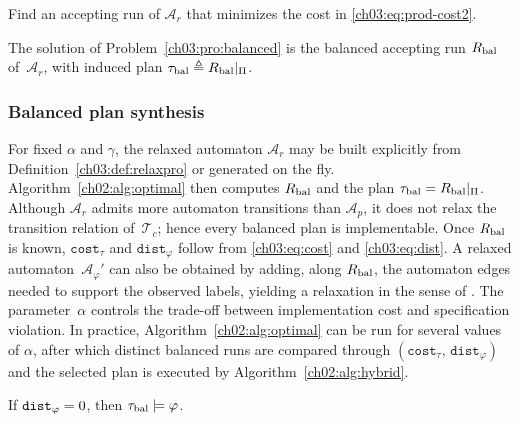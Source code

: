 \begin{problem}\label{ch03:pro:balanced}
Find an accepting run of $\mathcal{A}_r$ that minimizes the cost in
\eqref{ch03:eq:prod-cost2}.
\end{problem}

The solution of Problem~\ref{ch03:pro:balanced} is the balanced accepting run
$R_{\textup{bal}}$ of~$\mathcal{A}_r$, with induced plan
$\tau_{\textup{bal}} \triangleq R_{\textup{bal}}|_{\Pi}$.


\subsubsection{Balanced plan synthesis}\label{ch03:subsec:singleFeedback}

For fixed $\alpha$ and $\gamma$, the relaxed automaton $\mathcal{A}_r$ may be
built explicitly from Definition~\ref{ch03:def:relaxpro} or generated on the
fly. Algorithm~\ref{ch02:alg:optimal} then computes
$R_{\textup{bal}}$ and the plan
$\tau_{\textup{bal}} = R_{\textup{bal}}|_{\Pi}$. Although
$\mathcal{A}_r$ admits more automaton transitions than $\mathcal{A}_p$, it does
not relax the transition relation of~$\mathcal{T}_c$; hence every balanced plan
is implementable.
Once $R_{\textup{bal}}$ is known, $\texttt{cost}_{\tau}$ and
$\texttt{dist}_{\varphi}$ follow from \eqref{ch03:eq:cost} and
\eqref{ch03:eq:dist}. A relaxed automaton~$\mathcal{A}_{\varphi}'$ can also be
obtained by adding, along $R_{\textup{bal}}$, the automaton edges needed to
support the observed labels, yielding a relaxation in the sense of
\citet{kim2012approximate}.
The parameter~$\alpha$ controls the trade-off between implementation cost and
specification violation. In practice, Algorithm~\ref{ch02:alg:optimal} can be
run for several values of $\alpha$, after which distinct balanced runs are
compared through $(\texttt{cost}_{\tau},\, \texttt{dist}_{\varphi})$ and the
selected plan is executed by Algorithm~\ref{ch02:alg:hybrid}.

\begin{lemma}\label{ch03:lem:distanceProof}
If $\textup{\texttt{dist}}_{\varphi} = 0$, then
$\tau_{\textup{bal}} \models \varphi$.
\end{lemma}

